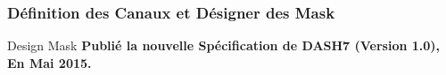 \documentclass[8pt]{beamer}
\newcommand{\1}{\mathbbm 1}
\begin{document}
\subsubsection{Définition des Canaux et Désigner des Mask}
\begin{frame}{Design Mask}
\textbf{Publié la nouvelle Spécification de DASH7 (Version 1.0), En Mai 2015.}
\begin{figure}

\end{figure}
\end{frame}
\end{document}
